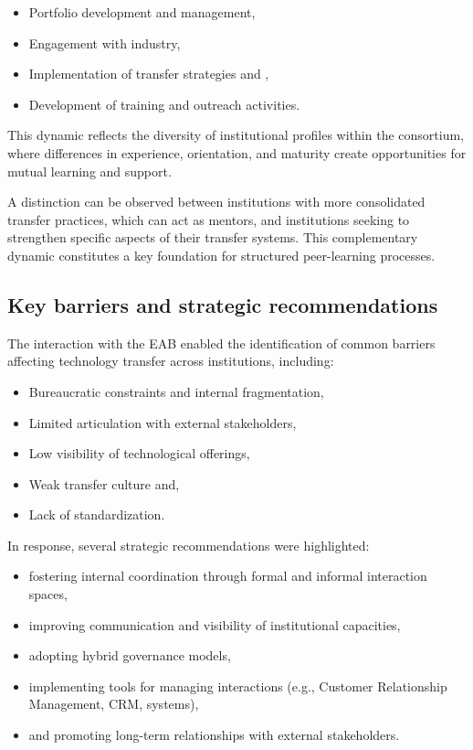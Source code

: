 \documentclass[
  12pt,
  oneside]{book}
\providecommand{\tightlist}{%
  \setlength{\itemsep}{0pt}\setlength{\parskip}{0pt}}
\begin{document}
\begin{itemize}
\tightlist
\item
  Portfolio development and management,
\item
  Engagement with industry,
\item
  Implementation of transfer strategies and ,
\item
  Development of training and outreach activities.
\end{itemize}

This dynamic reflects the diversity of institutional profiles within the
consortium, where differences in experience, orientation, and maturity
create opportunities for mutual learning and support.

A distinction can be observed between institutions with more
consolidated transfer practices, which can act as mentors, and
institutions seeking to strengthen specific aspects of their transfer
systems. This complementary dynamic constitutes a key foundation for
structured peer-learning processes.

\subsection{Key barriers and strategic
recommendations}\label{key-barriers-and-strategic-recommendations}

The interaction with the EAB enabled the identification of common
barriers affecting technology transfer across institutions, including:

\begin{itemize}
\tightlist
\item
  Bureaucratic constraints and internal fragmentation,
\item
  Limited articulation with external stakeholders,
\item
  Low visibility of technological offerings,
\item
  Weak transfer culture and,
\item
  Lack of standardization.
\end{itemize}

In response, several strategic recommendations were highlighted:

\begin{itemize}
\tightlist
\item
  fostering internal coordination through formal and informal
  interaction spaces,
\item
  improving communication and visibility of institutional capacities,
\item
  adopting hybrid governance models,
\item
  implementing tools for managing interactions (e.g., Customer
  Relationship Management, CRM, systems),
\item
  and promoting long-term relationships with external stakeholders.
\end{itemize}
\end{document}
